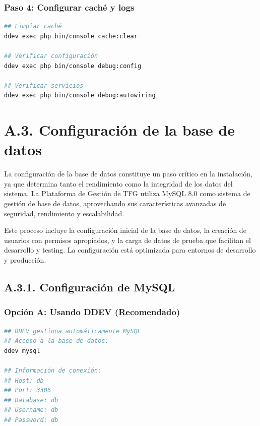 \documentclass[12pt,a4paper,oneside]{report}
\begin{document}
\subsubsection{Paso 4: Configurar caché y
logs}\label{paso-4-configurar-cachuxe9-y-logs}

\begin{lstlisting}[language=bash]
## Limpiar caché
ddev exec php bin/console cache:clear

## Verificar configuración
ddev exec php bin/console debug:config

## Verificar servicios
ddev exec php bin/console debug:autowiring
\end{lstlisting}

\section{A.3. Configuración de la base de
datos}\label{a.3.-configuraciuxf3n-de-la-base-de-datos}

La configuración de la base de datos constituye un paso crítico en la instalación, ya que determina tanto el rendimiento como la integridad de los datos del sistema. La Plataforma de Gestión de TFG utiliza MySQL 8.0 como sistema de gestión de base de datos, aprovechando sus características avanzadas de seguridad, rendimiento y escalabilidad.

Este proceso incluye la configuración inicial de la base de datos, la creación de usuarios con permisos apropiados, y la carga de datos de prueba que facilitan el desarrollo y testing. La configuración está optimizada para entornos de desarrollo y producción.

\subsection{A.3.1. Configuración de
MySQL}\label{a.3.1.-configuraciuxf3n-de-mysql}

\subsubsection{Opción A: Usando DDEV
(Recomendado)}\label{opciuxf3n-a-usando-ddev-recomendado}

\begin{lstlisting}[language=bash]
## DDEV gestiona automáticamente MySQL
## Acceso a la base de datos:
ddev mysql

## Información de conexión:
## Host: db
## Port: 3306  
## Database: db
## Username: db
## Password: db
\end{lstlisting}
\end{document}
